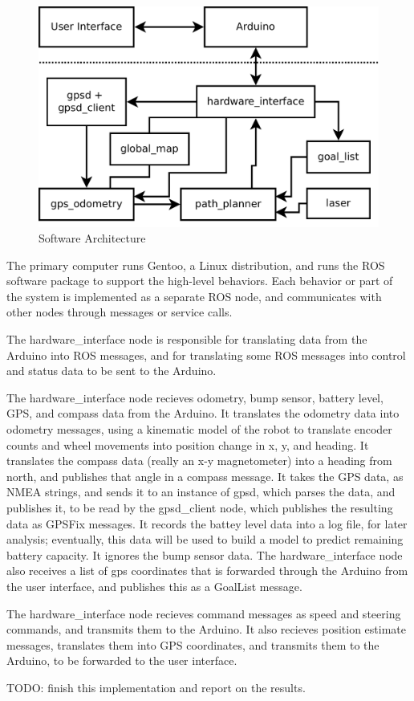 
\begin{figure}
\includegraphics[width=1\textwidth]{software_flow}
\caption{Software Architecture}
\end{figure}

The primary computer runs Gentoo, a Linux distribution, and runs the ROS software package to support the high-level behaviors. Each behavior or part of the system is implemented as a separate ROS node, and communicates with other nodes through messages or service calls.

The hardware\_interface node is responsible for translating data from the Arduino into ROS messages, and for translating some ROS messages into control and status data to be sent to the Arduino. 

The hardware\_interface node recieves odometry, bump sensor, battery level, GPS, and compass data from the Arduino. It translates the odometry data into odometry messages, using a kinematic model of the robot to translate encoder counts and wheel movements into position change in x, y, and heading. It translates the compass data (really an x-y magnetometer) into a heading from north, and publishes that angle in a compass message. It takes the GPS data, as NMEA strings, and sends it to an instance of gpsd\cite{gpsd}, which parses the data, and publishes it, to be read by the gpsd\_client node, which publishes the resulting data as GPSFix messages. It records the battey level data into a log file, for later analysis; eventually, this data will be used to build a model to predict remaining battery capacity. It ignores the bump sensor data. The hardware\_interface node also receives a list of gps coordinates that is forwarded through the Arduino from the user interface, and publishes this as a GoalList message.

The hardware\_interface node recieves command messages as speed and steering commands, and transmits them to the Arduino. It also recieves position estimate messages, translates them into GPS coordinates, and transmits them to the Arduino, to be forwarded to the user interface.



TODO: finish this implementation and report on the results.


